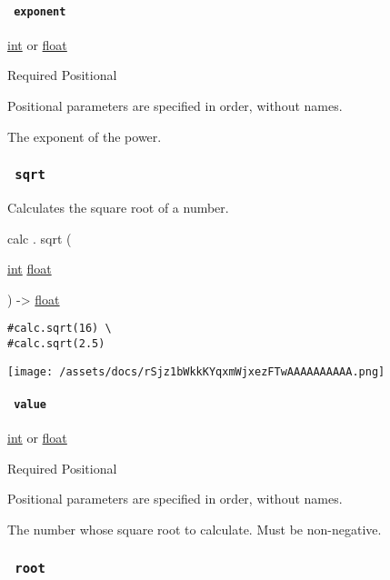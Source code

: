 \paragraph{\texorpdfstring{\texttt{\ exponent\ }}{ exponent }}\label{functions-exp-exponent}

\href{/docs/reference/foundations/int/}{int} {or}
\href{/docs/reference/foundations/float/}{float}

{Required} {{ Positional }}

\label{functions-exp-exponent-positional-tooltip}
Positional parameters are specified in order, without names.

The exponent of the power.

\subsubsection{\texorpdfstring{\texttt{\ sqrt\ }}{ sqrt }}\label{functions-sqrt}

Calculates the square root of a number.

calc { . } { sqrt } (

{ \href{/docs/reference/foundations/int/}{int}
\href{/docs/reference/foundations/float/}{float} }

) -\textgreater{} \href{/docs/reference/foundations/float/}{float}

\begin{verbatim}
#calc.sqrt(16) \
#calc.sqrt(2.5)
\end{verbatim}

\texttt{[image: /assets/docs/rSjz1bWkkKYqxmWjxezFTwAAAAAAAAAA.png]}

\paragraph{\texorpdfstring{\texttt{\ value\ }}{ value }}\label{functions-sqrt-value}

\href{/docs/reference/foundations/int/}{int} {or}
\href{/docs/reference/foundations/float/}{float}

{Required} {{ Positional }}

\label{functions-sqrt-value-positional-tooltip}
Positional parameters are specified in order, without names.

The number whose square root to calculate. Must be non-negative.

\subsubsection{\texorpdfstring{\texttt{\ root\ }}{ root }}\label{functions-root}

